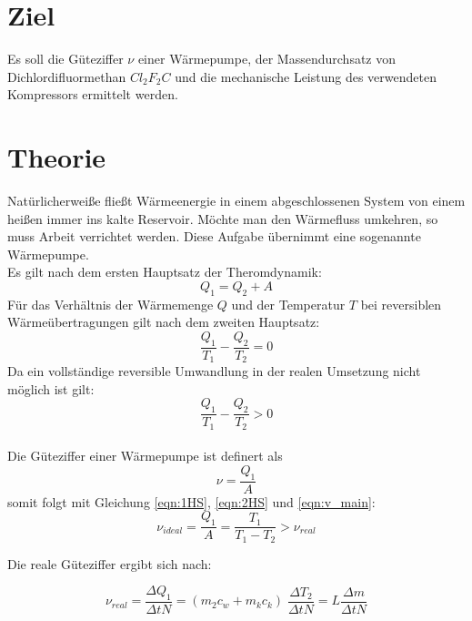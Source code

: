  \section*{Ziel}
    Es soll die Güteziffer $\nu$ einer Wärmepumpe, der Massendurchsatz 
    von Dichlordifluormethan $Cl_2F_2C$ und die mechanische Leistung des verwendeten
    Kompressors ermittelt werden.
\section{Theorie}  
\label{sec:theorie}
    Natürlicherweiße fließt Wärmeenergie in einem abgeschlossenen
    System von einem heißen immer ins kalte Reservoir.
    Möchte man den Wärmefluss umkehren, so muss Arbeit verrichtet werden.
    Diese Aufgabe übernimmt eine sogenannte Wärmepumpe.\\
    Es gilt nach dem ersten Hauptsatz der Theromdynamik:
    \begin{equation}
        Q_1=Q_2+A
        \label{eqn:1HS}
    \end{equation}
    Für das Verhältnis der Wärmemenge $Q$ und der Temperatur $T$ bei reversiblen
    Wärmeübertragungen gilt nach dem zweiten Hauptsatz:
    \begin{equation}
        \frac{Q_1}{T_1}-\frac{Q_2}{T_2}=0
        \label{eqn:2HS}
    \end{equation}
    Da ein vollständige reversible Umwandlung in der realen Umsetzung 
    nicht möglich ist gilt:
    \begin{equation*}
        \frac{Q_1}{T_1}-\frac{Q_2}{T_2}>0
    \end{equation*}\\

    Die Güteziffer einer Wärmepumpe ist definert als 
    \begin{equation}
        \nu=\frac{Q_1}{A}
        \label{eqn:v_main}
    \end{equation}
    somit folgt mit Gleichung \eqref{eqn:1HS}, \eqref{eqn:2HS} und \eqref{eqn:v_main}:
    \begin{equation}
        \nu_{ideal}=\frac{Q_1}{A}=\frac{T_1}{T_1-T_2}>\nu_{real}
    \end{equation}

Die reale Güteziffer ergibt sich nach:
    
    \begin{equation}
        \nu_{real}=\frac{\Delta Q_1}{\Delta tN}=(m_2c_w + m_kc_k)\;\frac{\Delta T_2}{\Delta tN}=L\frac{\Delta m}{\Delta tN}     
    \end{equation}
        
